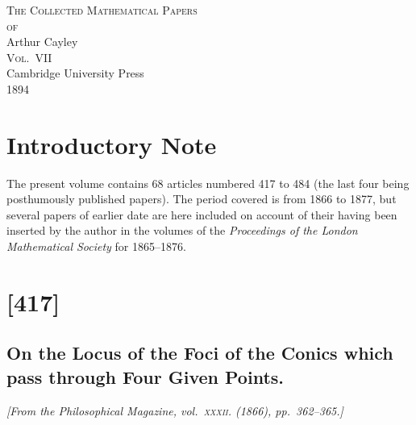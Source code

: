 \documentclass[11pt,a4paper]{article}
\theoremstyle{plain}
\theoremstyle{definition}
\begin{document}
\thispagestyle{empty}
\begin{center}
\vspace*{2cm}
{\Huge\scshape The Collected Mathematical Papers}\\[1.5em]
{\LARGE\scshape of}\\[1.5em]
{\Huge Arthur Cayley}\\[2em]
{\LARGE\scshape Vol.\ VII}\\[3em]
{\large Cambridge University Press}\\[1em]
{1894}
\end{center}
\vfill
\clearpage

\thispagestyle{empty}
\section*{Introductory Note}

The present volume contains 68 articles numbered 417 to 484 (the last four
being posthumously published papers).  The period covered is from 1866 to
1877, but several papers of earlier date are here included on account of their
having been inserted by the author in the volumes of the \textit{Proceedings of the
London Mathematical Society} for 1865--1876.

\clearpage

\tableofcontents
\clearpage

\section{[417]}
\subsection{On the Locus of the Foci of the Conics which pass through Four
Given Points.}

\begin{center}
\textit{[From the Philosophical Magazine, vol.~\textsc{xxxii}. (1866), pp.~362--365.]}
\end{center}
\end{document}
